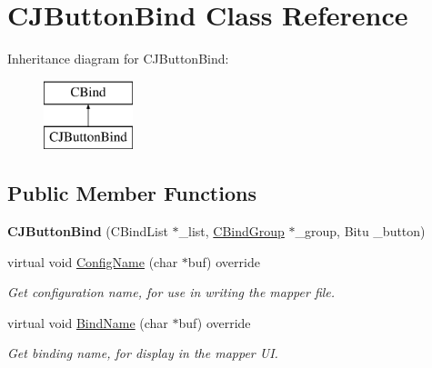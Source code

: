 \hypertarget{classCJButtonBind}{\section{C\-J\-Button\-Bind Class Reference}
\label{classCJButtonBind}
}
Inheritance diagram for C\-J\-Button\-Bind\-:\begin{figure}[H]
\begin{center}
\leavevmode
\includegraphics[height=2.000000cm]{classCJButtonBind}
\end{center}
\end{figure}
\subsection*{Public Member Functions}
\begin{DoxyCompactItemize}
\item 
\hypertarget{classCJButtonBind_a087e9681558df38907c7d57a373ec115}{{\bfseries C\-J\-Button\-Bind} (C\-Bind\-List $\ast$\-\_\-list, \hyperlink{classCBindGroup}{C\-Bind\-Group} $\ast$\-\_\-group, Bitu \-\_\-button)}\label{classCJButtonBind_a087e9681558df38907c7d57a373ec115}

\item 
\hypertarget{classCJButtonBind_abfce479e04f900654f77d1e2a9016a9f}{virtual void \hyperlink{classCJButtonBind_abfce479e04f900654f77d1e2a9016a9f}{Config\-Name} (char $\ast$buf) override}\label{classCJButtonBind_abfce479e04f900654f77d1e2a9016a9f}

\begin{DoxyCompactList}\small\item\em Get configuration name, for use in writing the mapper file. \end{DoxyCompactList}\item 
\hypertarget{classCJButtonBind_abc335d80e55b2e381cfda81b04c86edd}{virtual void \hyperlink{classCJButtonBind_abc335d80e55b2e381cfda81b04c86edd}{Bind\-Name} (char $\ast$buf) override}\label{classCJButtonBind_abc335d80e55b2e381cfda81b04c86edd}

\begin{DoxyCompactList}\small\item\em Get binding name, for display in the mapper U\-I. \end{DoxyCompactList}\end{DoxyCompactItemize}
